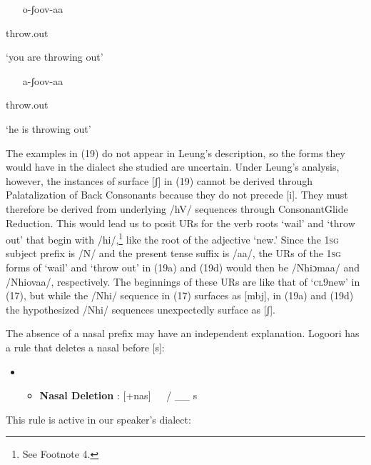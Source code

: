 \begin{itemize}
\item [o-ʃoov-aa]  

\end{itemize}

throw.out 

‘you are throwing out’

\begin{itemize}
\item [a-ʃoov-aa]  

\end{itemize}

throw.out 

‘he is throwing out’

The examples in (19) do not appear in Leung’s description, so the forms they would have in the dialect she studied are uncertain. Under Leung’s analysis, however, the instances of surface [ʃ] in (19) cannot be derived through Palatalization of Back Consonants because they do not precede [i]. They must therefore be derived from underlying /hV/ sequences through ConsonantGlide Reduction. This would lead us to posit URs for the verb roots ‘wail’ and ‘throw out’ that begin with /hi/,\footnote{   See Footnote 4.} like the root of the adjective ‘new.’ Since the 1\textsc{sg} subject prefix is /N/ and the present tense suffix is /aa/, the URs of the 1\textsc{sg} forms of ‘wail’ and ‘throw out’ in (19a) and (19d) would then be /Nhiɔmaa/ and /Nhiovaa/, respectively. The beginnings of these URs are like that of ‘\textsc{cl}9new’ in (17), but while the /Nhi/ sequence in (17) surfaces as [mbj], in (19a) and (19d) the hypothesized /Nhi/ sequences unexpectedly surface as [ʃ]. 

The absence of a nasal prefix may have an independent explanation. Logoori has a rule that deletes a nasal before [s]:

\setcounter{itemize}{0}
\begin{itemize}
\item \setcounter{itemize}{0}
\begin{itemize}
\item \textbf{Nasal Deletion }\citep[116]{Leung1991}: [+nas]   / \_\_ s

\end{itemize}
\end{itemize}

This rule is active in our speaker’s dialect:

